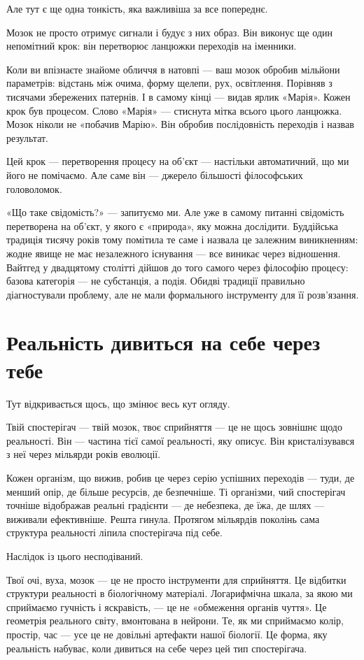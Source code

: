 \documentclass[12pt, a4paper, openany]{book}
\begin{document}
Але тут є ще одна тонкість, яка важливіша за все попереднє.

Мозок не просто отримує сигнали і будує з них образ. Він виконує ще один непомітний крок: він перетворює ланцюжки переходів на іменники.

Коли ви впізнаєте знайоме обличчя в натовпі --- ваш мозок обробив мільйони параметрів: відстань між очима, форму щелепи, рух, освітлення. Порівняв з тисячами збережених патернів. І в самому кінці --- видав ярлик «Марія». Кожен крок був процесом. Слово «Марія» --- стиснута мітка всього цього ланцюжка. Мозок ніколи не «побачив Марію». Він обробив послідовність переходів і назвав результат.

Цей крок --- перетворення процесу на об'єкт --- настільки автоматичний, що ми його не помічаємо. Але саме він — джерело більшості філософських головоломок.

«Що таке свідомість?» --- запитуємо ми. Але уже в самому питанні свідомість перетворена на об'єкт, у якого є «природа», яку можна дослідити. Буддійська традиція тисячу років тому помітила те саме і назвала це залежним виникненням: жодне явище не має незалежного існування --- все виникає через відношення. Вайтгед у двадцятому столітті дійшов до того самого через філософію процесу: базова категорія --- не субстанція, а подія. Обидві традиції правильно діагностували проблему, але не мали формального інструменту для її розв'язання.

\section{Реальність дивиться на себе через тебе}

Тут відкривається щось, що змінює весь кут огляду.

Твій спостерігач --- твій мозок, твоє сприйняття --- це не щось зовнішнє щодо реальності. Він — частина тієї самої реальності, яку описує. Він кристалізувався з неї через мільярди років еволюції.

Кожен організм, що вижив, робив це через серію успішних переходів --- туди, де менший опір, де більше ресурсів, де безпечніше. Ті організми, чий спостерігач точніше відображав реальні градієнти --- де небезпека, де їжа, де шлях --- виживали ефективніше. Решта гинула. Протягом мільярдів поколінь сама структура реальності ліпила спостерігача під себе.

Наслідок із цього несподіваний.

Твої очі, вуха, мозок --- це не просто інструменти для сприйняття. Це відбитки структури реальності в біологічному матеріалі. Логарифмічна шкала, за якою ми сприймаємо гучність і яскравість, --- це не «обмеження органів чуття». Це геометрія реального світу, вмонтована в нейрони. Те, як ми сприймаємо колір, простір, час --- усе це не довільні артефакти нашої біології. Це форма, яку реальність набуває, коли дивиться на себе через цей тип спостерігача.
\end{document}
